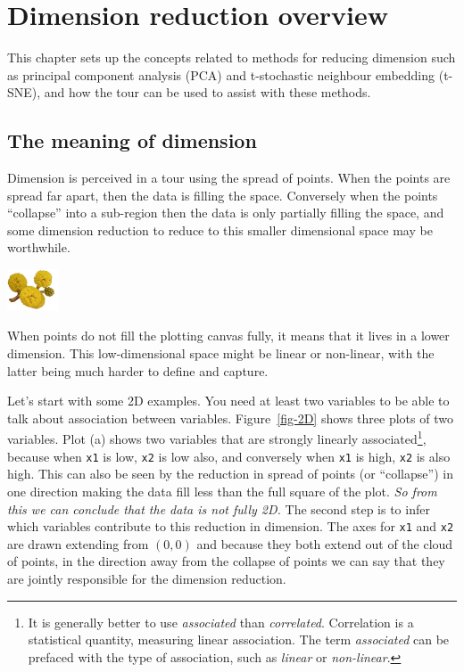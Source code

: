 \documentclass[
  letterpaper,
]{krantz}
\newcommand{\infobox}[1]{%
\noindent\colorbox{info!30}{%
\begin{minipage}{0.98\linewidth}%
    \centering%
    \begin{minipage}[c]{0.15\linewidth} %
      \includegraphics[width=1.5cm]{images/mulga-flowers2.png} %
    \end{minipage}%
    \hfill %
    \begin{minipage}[c]{0.8\linewidth} %
      \bigskip%
      \textsf{#1}%
      \bigskip%
    \end{minipage}%
    \hspace*{3mm}%
  \end{minipage}%
}%
}
\begin{document}

\chapter{Dimension reduction overview}\label{sec-dimension-overview}

This chapter sets up the concepts related to methods for reducing
dimension such as principal component analysis (PCA) and t-stochastic
neighbour embedding (t-SNE), and how the tour can be used to assist with
these methods.

\section{The meaning of dimension}\label{the-meaning-of-dimension}

Dimension is perceived in a tour using the spread of points. When the
points are spread far apart, then the data is filling the space.
Conversely when the points ``collapse'' into a sub-region then the data
is only partially filling the space, and some dimension reduction to
reduce to this smaller dimensional space may be worthwhile.

\infobox{When points do not fill the plotting canvas fully, it means that it lives in a lower dimension. This low-dimensional space might be linear or non-linear, with the latter being much harder to define and capture.}

Let's start with some 2D examples. You need at least two variables to be
able to talk about association between variables. Figure~\ref{fig-2D}
shows three plots of two variables. Plot (a) shows two variables that
are strongly linearly associated\footnote{It is generally better to use
  \emph{associated} than \emph{correlated}. Correlation is a statistical
  quantity, measuring linear association. The term \emph{associated} can
  be prefaced with the type of association, such as \emph{linear} or
  \emph{non-linear}.}, because when \texttt{x1} is low, \texttt{x2} is
low also, and conversely when \texttt{x1} is high, \texttt{x2} is also
high. This can also be seen by the reduction in spread of points (or
``collapse'') in one direction making the data fill less than the full
square of the plot. \emph{So from this we can conclude that the data is
not fully 2D.} The second step is to infer which variables contribute to
this reduction in dimension. The axes for \texttt{x1} and \texttt{x2}
are drawn extending from \((0,0)\) and because they both extend out of
the cloud of points, in the direction away from the collapse of points
we can say that they are jointly responsible for the dimension
reduction.
\end{document}
